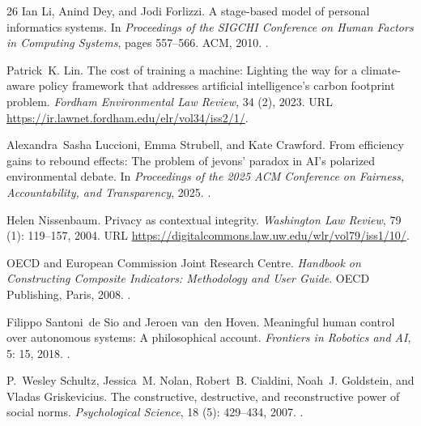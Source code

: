 \documentclass[11pt,a4paper]{article}
\begin{document}
\begin{thebibliography}{26}
Ian Li, Anind Dey, and Jodi Forlizzi.
\newblock A stage-based model of personal informatics systems.
\newblock In \emph{Proceedings of the SIGCHI Conference on Human Factors in
  Computing Systems}, pages 557--566. ACM, 2010.
\newblock {}.

Patrick~K. Lin.
\newblock The cost of training a machine: Lighting the way for a climate-aware
  policy framework that addresses artificial intelligence's carbon footprint
  problem.
\newblock \emph{Fordham Environmental Law Review}, 34 (2), 2023.
\newblock URL \url{https://ir.lawnet.fordham.edu/elr/vol34/iss2/1/}.

Alexandra~Sasha Luccioni, Emma Strubell, and Kate Crawford.
\newblock From efficiency gains to rebound effects: The problem of jevons'
  paradox in {AI}'s polarized environmental debate.
\newblock In \emph{Proceedings of the 2025 ACM Conference on Fairness,
  Accountability, and Transparency}, 2025.
\newblock {}.

Helen Nissenbaum.
\newblock Privacy as contextual integrity.
\newblock \emph{Washington Law Review}, 79 (1): 119--157,
  2004.
\newblock URL \url{https://digitalcommons.law.uw.edu/wlr/vol79/iss1/10/}.

{OECD} and {European Commission Joint Research Centre}.
\newblock \emph{Handbook on Constructing Composite Indicators: Methodology and
  User Guide}.
\newblock OECD Publishing, Paris, 2008.
\newblock {}.

Filippo Santoni~de Sio and Jeroen van~den Hoven.
\newblock Meaningful human control over autonomous systems: A philosophical
  account.
\newblock \emph{Frontiers in Robotics and AI}, 5: 15, 2018.
\newblock {}.

P.~Wesley Schultz, Jessica~M. Nolan, Robert~B. Cialdini, Noah~J. Goldstein, and
  Vladas Griskevicius.
\newblock The constructive, destructive, and reconstructive power of social
  norms.
\newblock \emph{Psychological Science}, 18 (5): 429--434,
  2007.
\newblock {}.


\end{thebibliography}
\end{document}
